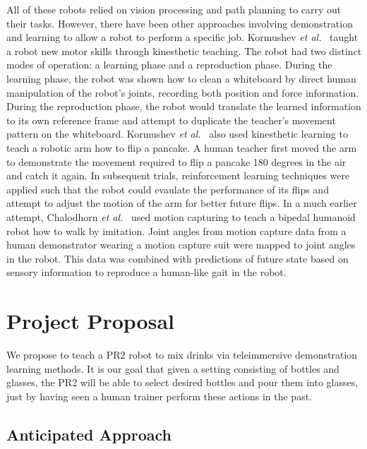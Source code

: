 \documentclass{sig-alternate}
\begin{document}
All of these robots relied on vision processing and path planning to carry out their tasks. However, there have been other approaches involving demonstration and learning to allow a robot to perform a specific job. Kormushev \textit{et al.}~\cite{whiteboard} taught a robot new motor skills through kinesthetic teaching. The robot had two distinct modes of operation: a learning phase and a reproduction phase. During the learning phase, the robot was shown how to clean a whiteboard by direct human manipulation of the robot's joints, recording both position and force information. During the reproduction phase, the robot would translate the learned information to its own reference frame and attempt to duplicate the teacher's movement pattern on the whiteboard.  Kormushev \textit{et al.}~\cite{pancakes} also used kinesthetic learning to teach a robotic arm how to flip a pancake. A human teacher first moved the arm to demonstrate the movement required to flip a pancake 180 degrees in the air and catch it again. In subsequent trials, reinforcement learning techniques were applied such that the robot could evaulate the performance of its flips and attempt to adjust the motion of the arm for better future flips. In a much earlier attempt, Chalodhorn \textit{et al.}~\cite{walk_imitation} used motion capturing to teach a bipedal humanoid robot how to walk by imitation. Joint angles from motion capture data from a human demonstrator wearing a motion capture suit were mapped to joint angles in the robot. This data was combined with predictions of future state based on sensory information to reproduce a human-like gait in the robot. 

\section{Project Proposal}
\label{sec:project_proposal}We propose to teach a PR2 robot to mix drinks via
teleimmersive demonstration learning methods. It is our goal that given a 
setting consisting of bottles and glasses, the PR2 will be able to select
desired bottles and pour them into glasses, just by having seen a human
trainer perform these actions in the past.

\subsection{Anticipated Approach}
\label{subsec:approach}
\end{document}
